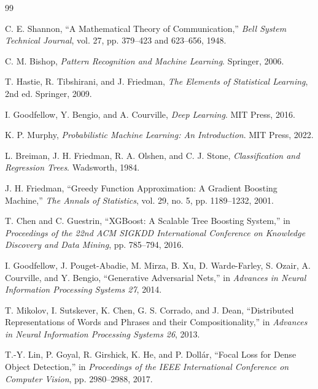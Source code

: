 \documentclass[11pt]{article}
\theoremstyle{definition}
\begin{document}
\small
\begin{thebibliography}{99}

C. E. Shannon,
``A Mathematical Theory of Communication,''
\emph{Bell System Technical Journal}, vol. 27, pp. 379--423 and 623--656, 1948.

C. M. Bishop,
\emph{Pattern Recognition and Machine Learning}.
Springer, 2006.

T. Hastie, R. Tibshirani, and J. Friedman,
\emph{The Elements of Statistical Learning}, 2nd ed.
Springer, 2009.

I. Goodfellow, Y. Bengio, and A. Courville,
\emph{Deep Learning}.
MIT Press, 2016.

K. P. Murphy,
\emph{Probabilistic Machine Learning: An Introduction}.
MIT Press, 2022.

L. Breiman, J. H. Friedman, R. A. Olshen, and C. J. Stone,
\emph{Classification and Regression Trees}.
Wadsworth, 1984.

J. H. Friedman,
``Greedy Function Approximation: A Gradient Boosting Machine,''
\emph{The Annals of Statistics}, vol. 29, no. 5, pp. 1189--1232, 2001.

T. Chen and C. Guestrin,
``XGBoost: A Scalable Tree Boosting System,''
in \emph{Proceedings of the 22nd ACM SIGKDD International Conference on Knowledge Discovery and Data Mining}, pp. 785--794, 2016.

I. Goodfellow, J. Pouget-Abadie, M. Mirza, B. Xu, D. Warde-Farley,
S. Ozair, A. Courville, and Y. Bengio,
``Generative Adversarial Nets,''
in \emph{Advances in Neural Information Processing Systems 27}, 2014.

T. Mikolov, I. Sutskever, K. Chen, G. S. Corrado, and J. Dean,
``Distributed Representations of Words and Phrases and their Compositionality,''
in \emph{Advances in Neural Information Processing Systems 26}, 2013.

T.-Y. Lin, P. Goyal, R. Girshick, K. He, and P. Doll\'ar,
``Focal Loss for Dense Object Detection,''
in \emph{Proceedings of the IEEE International Conference on Computer Vision}, pp. 2980--2988, 2017.

\end{thebibliography}
\normalsize
\end{document}
